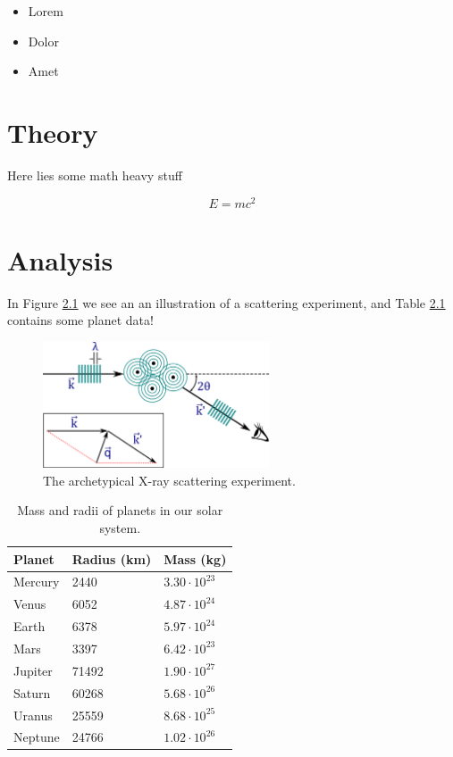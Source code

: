 \documentclass[a4paper,openright,twoside]{memoir}
\begin{document}
\begin{itemize}
\item Lorem
\item Dolor 
\item Amet
\end{itemize}


\chapter{Theory}

Here lies some math heavy stuff

\[ E = mc^2 \]

\chapter{Analysis}

In Figure \ref{fig:xray} we see an an illustration of a scattering experiment, and Table \ref{tab:planet-data} contains some planet data!

\begin{figure}
\centering
\includegraphics[width=0.6\textwidth]{img/xray.png}
\caption{The archetypical X-ray scattering experiment.}
\label{fig:xray}
\end{figure}

\begin{table}
\centering
\caption{Mass and radii of planets in our solar system.}
\label{tab:planet-data}
\begin{tabular}{@{}lll@{}}
\toprule
Planet & Radius (km) & Mass (kg) \\
\midrule
Mercury & 2440 & $3.30 \cdot 10^{23}$ \\
Venus & 6052 & $4.87 \cdot 10^{24}$ \\
Earth & 6378 & $5.97 \cdot 10^{24}$ \\
Mars & 3397 & $6.42\cdot 10^{23}$ \\
Jupiter & 71492 & $1.90\cdot 10^{27}$ \\
Saturn & 60268 & $5.68 \cdot 10^{26}$ \\
Uranus & 25559 & $8.68 \cdot 10^{25}$ \\
Neptune & 24766 & $1.02 \cdot 10^{26}$ \\ 
\bottomrule
\end{tabular}
\end{table}

\nocite{*}


\end{document}
